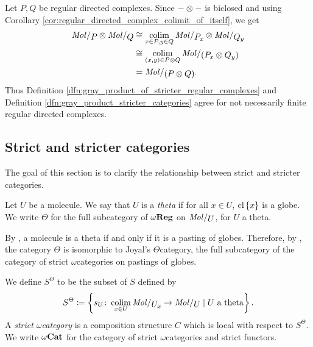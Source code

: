 \begin{rmk}
    Let \( P, Q \) be regular directed complexes.
    Since \( - \otimes - \) is biclosed and using Corollary \ref{cor:regular_directed_complex_colimit_of_itself}, we get
    \begin{align*}
        \molecin{P} \gray \molecin{Q} &\cong \colim_{x \in P, y \in Q} \molecin{\imel{P}{x}} \gray \molecin{\imel{Q}{y}} \\
                                      &\cong \colim_{(x, y) \in P \gray Q} \molecin{(\imel{P}{x} \gray \imel{Q}{y})} \\
                                      &= \molecin{(P \gray Q)}.
    \end{align*}
    Thus Definition \ref{dfn:gray_product_of_stricter_regular_complexes} and Definition \ref{dfn:gray_product_stricter_categories} agree for not necessarily finite regular directed complexes.
\end{rmk}

\subsection{Strict and stricter categories}

The goal of this section is to clarify the relationship between strict and stricter categories.

\begin{dfn} [Theta]
    Let \( U \) be a molecule.
    We say that \( U \) is a \emph{theta} if for all \( x \in U \), \( \mathrm{cl}\left\{ {x} \right\} \) is a globe.
    We write \( \Theta \) for the full subcategory of \( \omega\mathbf{Reg} \) on \( \molecin{U} \), for \( U \) a theta.
\end{dfn}

\begin{rmk} \label{rmk:theta_is_theta}
    By \cite[Corollary 9.1.29]{hadzihasanovic2024combinatorics}, a molecule is a theta if and only if it is a pasting of globes.
    Therefore, by \cite[Theorem 8.2.14, Lemma 9.1.16]{hadzihasanovic2024combinatorics}, the category \( \Theta \) is isomorphic to Joyal's \( \Theta \)\nbd category, the full subcategory of the category of strict \( \omega \)\nbd categories on pastings of globes.  
\end{rmk}

\begin{dfn} 
    We define \( S^\Theta \) to be the subset of \( S \) defined by 
    \begin{equation*}
        S^\Theta \eqdef \set{s_U \colon \colim_{x \in U} \molecin{\imel{U}{x}} \to \molecin{U} \mid U \text{ a theta}}.
    \end{equation*}  
    A \emph{strict \( \omega \)\nbd category} is a composition structure \( C \) which is local with respect to \( S^\Theta \).
    We write \( {\omega\mathbf{Cat}} \) for the category of strict \( \omega \)\nbd categories and strict functors.
\end{dfn}

